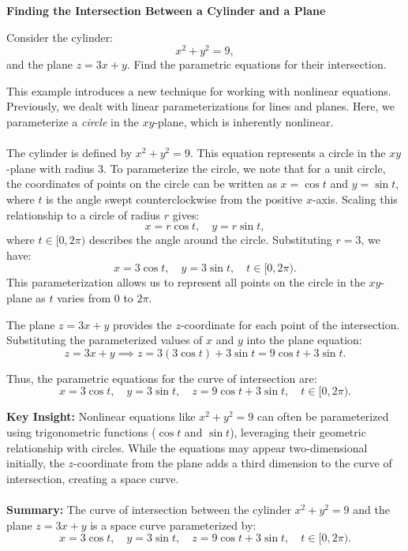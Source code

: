 \begin{example}
\textbf{Finding the Intersection Between a Cylinder and a Plane}

\noindent Consider the cylinder:
\[
x^2 + y^2 = 9,
\]
and the plane \( z = 3x + y \). Find the parametric equations for their intersection.

\begin{solution}

\noindent This example introduces a new technique for working with nonlinear equations. Previously, we dealt with linear parameterizations for lines and planes. Here, we parameterize a \textit{circle} in the \( xy \)-plane, which is inherently nonlinear.  \\ \\ The cylinder is defined by \( x^2 + y^2 = 9 \). This equation represents a circle in the \( xy \)-plane with radius 3. To parameterize the circle, we note that for a unit circle, the coordinates of points on the circle can be written as \( x = \cos t \) and \( y = \sin t \), where \( t \) is the angle swept counterclockwise from the positive \( x \)-axis. Scaling this relationship to a circle of radius \( r \) gives:
\[
x = r \cos t, \quad y = r \sin t,
\]
where \( t \in [0, 2\pi) \) describes the angle around the circle. Substituting \( r = 3 \), we have:
\[
x = 3 \cos t, \quad y = 3 \sin t, \quad t \in [0, 2\pi).
\]
This parameterization allows us to represent all points on the circle in the \( xy \)-plane as \( t \) varies from \( 0 \) to \( 2\pi \).

\noindent The plane \( z = 3x + y \) provides the \( z \)-coordinate for each point of the intersection. Substituting the parameterized values of \( x \) and \( y \) into the plane equation:
\[
z = 3x + y \implies z = 3(3 \cos t) + 3 \sin t = 9 \cos t + 3 \sin t.
\]

\noindent Thus, the parametric equations for the curve of intersection are:
\[
x = 3 \cos t, \quad y = 3 \sin t, \quad z = 9 \cos t + 3 \sin t, \quad t \in [0, 2\pi).
\]

\noindent \textbf{Key Insight:} Nonlinear equations like \( x^2 + y^2 = 9 \) can often be parameterized using trigonometric functions (\( \cos t \) and \( \sin t \)), leveraging their geometric relationship with circles. While the equations may appear two-dimensional initially, the \( z \)-coordinate from the plane adds a third dimension to the curve of intersection, creating a space curve. \\ \\ \textbf{Summary:} The curve of intersection between the cylinder \( x^2 + y^2 = 9 \) and the plane \( z = 3x + y \) is a space curve parameterized by:
\[
x = 3 \cos t, \quad y = 3 \sin t, \quad z = 9 \cos t + 3 \sin t, \quad t \in [0, 2\pi).
\]

\end{solution}
\end{example}
\exampleline


